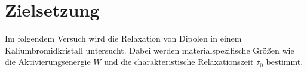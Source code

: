 \section{Zielsetzung}
\label{sec:Zielsetzung}

Im folgendem Versuch wird die Relaxation von Dipolen in einem Kaliumbromidkristall untersucht. Dabei werden materialspezifische Größen wie die Aktivierungsenergie $W$ und die charakteristische Relaxationszeit $\tau_0$ bestimmt. 
